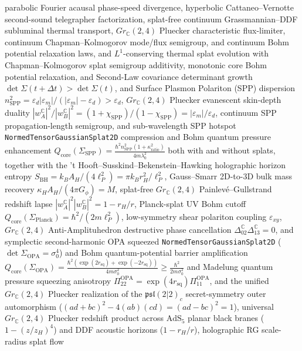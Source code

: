 parabolic Fourier acausal phase-speed divergence, hyperbolic Cattaneo--Vernotte
second-sound telegrapher factorization, splat-free continuum Grassmannian--DDF
subluminal thermal transport, $Gr_{\mathbb C}(2,4)$ Pluecker characteristic
flux-limiter, continuum Chapman--Kolmogorov mode/flux semigroup, and continuum
Bohm potential relaxation laws, and $L^1$-conserving thermal splat evolution
with Chapman--Kolmogorov splat semigroup additivity, monotonic core Bohm
potential relaxation, and Second-Law covariance determinant growth
$\det\Sigma(t+\Delta t)>\det\Sigma(t)$, and Surface Plasmon Polariton (SPP)
dispersion $n_{\mathrm{SPP}}^2=\varepsilon_d|\varepsilon_m|/(|\varepsilon_m|-\varepsilon_d)>\varepsilon_d$,
$Gr_{\mathbb C}(2,4)$ Pluecker evanescent skin-depth duality
$|w_A^{\mathbb C}|^2/|w_B^{\mathbb C}|^2=(1+\chi_{\mathrm{SPP}})/(1-\chi_{\mathrm{SPP}})=|\varepsilon_m|/\varepsilon_d$,
continuum SPP propagation-length semigroup, and sub-wavelength SPP hotspot
\texttt{NormedTensorGaussianSplat2D} compression and Bohm quantum pressure
enhancement $Q_{\mathrm{core}}(\Sigma_{\mathrm{SPP}})=\frac{\hbar^2 n_{\mathrm{SPP}}^2(1+\kappa_{\mathrm{ratio}}^2)}{4m\lambda_0^2}$
both with and without splats, together with the 't Hooft--Susskind--Bekenstein--Hawking
holographic horizon entropy $S_{\mathrm{BH}}=k_B A_H/(4\ell_P^2)=\pi k_B r_H^2/\ell_P^2$,
Gauss--Smarr 2D-to-3D bulk mass recovery $\kappa_H A_H/(4\pi G_\phi)=M$,
splat-free $Gr_{\mathbb C}(2,4)$ Painlev\'e--Gullstrand redshift lapse
$|w_A^{\mathbb C}|^2|w_B^{\mathbb C}|^2=1-r_H/r$, Planck-splat UV Bohm cutoff
$Q_{\mathrm{core}}(\Sigma_{\mathrm{Planck}})=\hbar^2/(2m\ell_P^2)$,
low-symmetry shear polariton coupling $\varepsilon_{xy}$,
$Gr_{\mathbb C}(2,4)$ Anti-Amplituhedron destructive phase cancellation
$\Delta_{02}^{\mathbb C}\Delta_{13}^{\mathbb C}=0$, and symplectic second-harmonic
OPA squeezed \texttt{NormedTensorGaussianSplat2D} ($\det\Sigma_{\mathrm{OPA}}=\sigma_0^4$)
and Bohm quantum-potential barrier amplification
$Q_{\mathrm{core}}(\Sigma_{\mathrm{OPA}})=\frac{\hbar^2(\exp(2r_{\mathrm{sq}})+\exp(-2r_{\mathrm{sq}}))}{4m\sigma_0^2}\ge\frac{\hbar^2}{2m\sigma_0^2}$
and Madelung quantum pressure squeezing anisotropy
$\Pi_{22}^{\mathrm{OPA}}=\exp(4r_{\mathrm{sq}})\Pi_{11}^{\mathrm{OPA}}$,
and the unified $Gr_{\mathbb C}(2,4)$ Pluecker realization of the
$\mathfrak{psl}(2|2)_c$ secret-symmetry outer automorphism
($(ad+bc)^2-4(ab)(cd)=(ad-bc)^2=1$), universal $Gr_{\mathbb C}(2,4)$ Pluecker
redshift product across $\text{AdS}_5$ planar black branes ($1-(z/z_H)^4$) and
DDF acoustic horizons ($1-r_H/r$), holographic RG scale-radius splat flow
